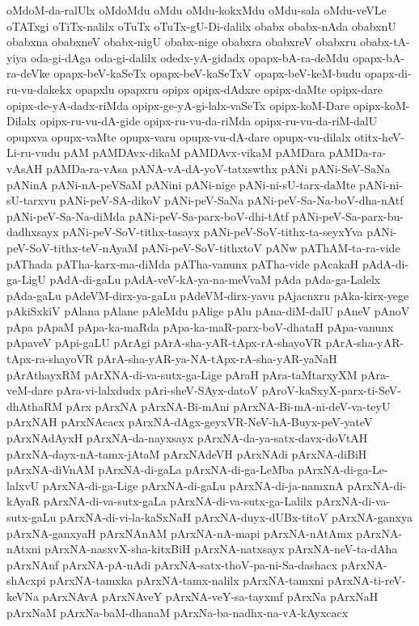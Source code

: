 {oMdoM-da-ralUlx
oMdoMdu
oMdu
oMdu-kokxMdu
oMdu-sala
oMdu-veVLe
oTATxgi
oTiTx-nalilx
oTuTx
oTuTx-gU-Di-dalilx
obabx
obabx-nAda
obabxnU
obabxna
obabxneV
obabx-nigU
obabx-nige
obabxra
obabxreV
obabxru
obabx-tA-yiya
oda-gi-dAga
oda-gi-dalilx
odedx-yA-gidadx
opapx-bA-ra-deMdu
opapx-bA-ra-deVke
opapx-beV-kaSeTx
opapx-beV-kaSeTxV
opapx-beV-keM-budu
opapx-di-ru-vu-dakekx
opapxlu
opapxru
opipx
opipx-dAdxre
opipx-daMte
opipx-dare
opipx-de-yA-dadx-riMda
opipx-ge-yA-gi-lalx-vaSeTx
opipx-koM-Dare
opipx-koM-Dilalx
opipx-ru-vu-dA-gide
opipx-ru-vu-da-riMda
opipx-ru-vu-da-riM-dalU
opupxva
opupx-vaMte
opupx-varu
opupx-vu-dA-dare
opupx-vu-dilalx
otitx-heV-Li-ru-vudu
pAM
pAMDAvx-dikaM
pAMDAvx-vikaM
pAMDara
pAMDa-ra-vAsAH
pAMDa-ra-vAsa
pANA-vA-dA-yoV-tatxswthx
pANi
pANi-SeV-SaNa
pANinA
pANi-nA-peVSaM
pANini
pANi-nige
pANi-ni-sU-tarx-daMte
pANi-ni-sU-tarxvu
pANi-peV-SA-dikoV
pANi-peV-SaNa
pANi-peV-Sa-Na-boV-dha-nAtf
pANi-peV-Sa-Na-diMda
pANi-peV-Sa-parx-boV-dhi-tAtf
pANi-peV-Sa-parx-bu-dadhxsayx
pANi-peV-SoV-tithx-tasayx
pANi-peV-SoV-tithx-ta-seyxYva
pANi-peV-SoV-tithx-teV-nAyaM
pANi-peV-SoV-tithxtoV
pANw
pAThAM-ta-ra-vide
pAThada
pATha-karx-ma-diMda
pATha-vanunx
pATha-vide
pAcakaH
pAdA-di-ga-LigU
pAdA-di-gaLu
pAdA-veV-kA-ya-na-meVvaM
pAda
pAda-ga-Lalelx
pAda-gaLu
pAdeVM-dirx-ya-gaLu
pAdeVM-dirx-yavu
pAjacnxru
pAka-kirx-yege
pAkiSxkiV
pAlana
pAlane
pAleMdu
pAlige
pAlu
pAna-diM-dalU
pAneV
pAnoV
pApa
pApaM
pApa-ka-maRda
pApa-ka-maR-parx-boV-dhataH
pApa-vanunx
pApaveV
pApi-gaLU
pArAgi
pArA-sha-yAR-tApx-rA-shayoVR
pArA-sha-yAR-tApx-ra-shayoVR
pArA-sha-yAR-ya-NA-tApx-rA-sha-yAR-yaNaH
pArAthayxRM
pArXNA-di-va-sutx-ga-Lige
pAraH
pAra-taMtarxyXM
pAra-veM-dare
pAra-vi-lalxdudx
pAri-sheV-SAyx-datoV
pAroV-kaSxyX-parx-ti-SeV-dhAthaRM
pArx
pArxNA
pArxNA-Bi-mAni
pArxNA-Bi-mA-ni-deV-va-teyU
pArxNAH
pArxNAcacx
pArxNA-dAgx-geyxVR-NeV-hA-Buyx-peV-yateV
pArxNAdAyxH
pArxNA-da-nayxsayx
pArxNA-da-ya-satx-davx-doVtAH
pArxNA-dayx-nA-tamx-jAtaM
pArxNAdeVH
pArxNAdi
pArxNA-diBiH
pArxNA-diVnAM
pArxNA-di-gaLa
pArxNA-di-ga-LeMba
pArxNA-di-ga-Le-lalxvU
pArxNA-di-ga-Lige
pArxNA-di-gaLu
pArxNA-di-ja-namxnA
pArxNA-di-kAyaR
pArxNA-di-va-sutx-gaLa
pArxNA-di-va-sutx-ga-Lalilx
pArxNA-di-va-sutx-gaLu
pArxNA-di-vi-la-kaSxNaH
pArxNA-duyx-dUBx-titoV
pArxNA-ganxya
pArxNA-ganxyaH
pArxNAnAM
pArxNA-nA-mapi
pArxNA-nAtAmx
pArxNA-nAtxni
pArxNA-nasxvX-sha-kitxBiH
pArxNA-natxsayx
pArxNA-neV-ta-dAha
pArxNAnf
pArxNA-pA-nAdi
pArxNA-satx-thoV-pa-ni-Sa-dashacx
pArxNA-shAcxpi
pArxNA-tamxka
pArxNA-tamx-nalilx
pArxNA-tamxni
pArxNA-ti-reV-keVNa
pArxNAvA
pArxNAveY
pArxNA-veY-sa-tayxmf
pArxNa
pArxNaH
pArxNaM
pArxNa-baM-dhanaM
pArxNa-ba-nadhx-na-vA-kAyxcacx
}
